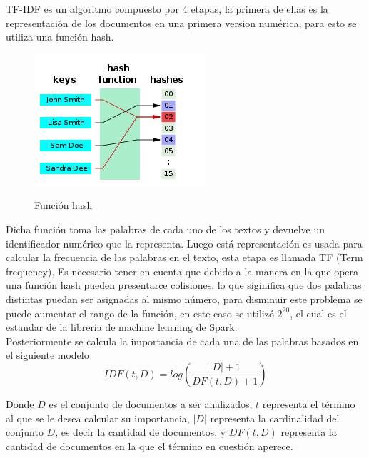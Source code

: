 \documentclass[conference,compsoc]{IEEEtran}
\begin{document}
TF-IDF es un algoritmo compuesto por 4 etapas, la primera de ellas es la
representación de los documentos en una primera version numérica, para esto
se utiliza una función hash.

\begin{figure}[H]
    \centering
    \includegraphics[scale=0.6]{hash.png}
    \caption{Función hash} \cite{hash}
\end{figure}

Dicha función toma las palabras de cada uno de los textos y devuelve un
identificador numérico que la representa. Luego está representación es usada
para calcular la frecuencia de las palabras en el texto, esta etapa es llamada
TF (Term frequency). Es necesario tener en cuenta que debido a la manera en la
que opera una función hash pueden presentarce colisiones, lo que siginifica
que dos palabras distintas puedan ser asignadas al mismo número, para disminuir este problema se puede aumentar el rango de la función, en este caso
se utilizó $2^{20}$, el cual es el estandar de la libreria de machine learning
de Spark.\\

Posteriormente se calcula la importancia de cada una de las palabras basados en el siguiente modelo\\

\begin{equation}
    IDF(t,D) = log \left( \frac{|D| + 1}{DF(t,D) + 1} \right)
\end{equation}

\vspace{0.5cm}

Donde $D$ es el conjunto de documentos a ser analizados, $t$ representa el
término al que se le desea calcular su importancia, $|D|$ representa la
cardinalidad del conjunto $D$, es decir la cantidad de documentos, y $DF(t,D)$
representa la cantidad de documentos en la que el término en cuestión aperece.\\
\end{document}
